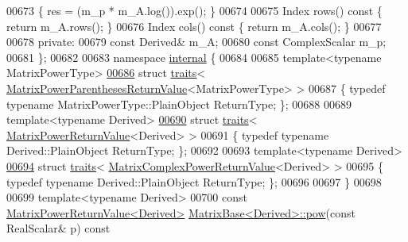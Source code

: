 \begin{DoxyCode}
00673 \textcolor{keyword}{    }\{ res = (m\_p * m\_A.log()).exp(); \}
00674 
00675     Index rows()\textcolor{keyword}{ const }\{ \textcolor{keywordflow}{return} m\_A.rows(); \}
00676     Index cols()\textcolor{keyword}{ const }\{ \textcolor{keywordflow}{return} m\_A.cols(); \}
00677 
00678   \textcolor{keyword}{private}:
00679     \textcolor{keyword}{const} Derived& m\_A;
00680     \textcolor{keyword}{const} ComplexScalar m\_p;
00681 \};
00682 
00683 \textcolor{keyword}{namespace }\hyperlink{namespaceinternal}{internal} \{
00684 
00685 \textcolor{keyword}{template}<\textcolor{keyword}{typename} MatrixPowerType>
\hyperlink{struct_eigen_1_1internal_1_1traits_3_01_matrix_power_parentheses_return_value_3_01_matrix_power_type_01_4_01_4}{00686} \textcolor{keyword}{struct }\hyperlink{struct_eigen_1_1internal_1_1traits}{traits}< \hyperlink{class_eigen_1_1_matrix_power_parentheses_return_value}{MatrixPowerParenthesesReturnValue}<MatrixPowerType> >
00687 \{ \textcolor{keyword}{typedef} \textcolor{keyword}{typename} MatrixPowerType::PlainObject ReturnType; \};
00688 
00689 \textcolor{keyword}{template}<\textcolor{keyword}{typename} Derived>
\hyperlink{struct_eigen_1_1internal_1_1traits_3_01_matrix_power_return_value_3_01_derived_01_4_01_4}{00690} \textcolor{keyword}{struct }\hyperlink{struct_eigen_1_1internal_1_1traits}{traits}< \hyperlink{class_eigen_1_1_matrix_power_return_value}{MatrixPowerReturnValue}<Derived> >
00691 \{ \textcolor{keyword}{typedef} \textcolor{keyword}{typename} Derived::PlainObject ReturnType; \};
00692 
00693 \textcolor{keyword}{template}<\textcolor{keyword}{typename} Derived>
\hyperlink{struct_eigen_1_1internal_1_1traits_3_01_matrix_complex_power_return_value_3_01_derived_01_4_01_4}{00694} \textcolor{keyword}{struct }\hyperlink{struct_eigen_1_1internal_1_1traits}{traits}< \hyperlink{class_eigen_1_1_matrix_complex_power_return_value}{MatrixComplexPowerReturnValue}<Derived> >
00695 \{ \textcolor{keyword}{typedef} \textcolor{keyword}{typename} Derived::PlainObject ReturnType; \};
00696 
00697 \}
00698 
00699 \textcolor{keyword}{template}<\textcolor{keyword}{typename} Derived>
00700 \textcolor{keyword}{const} \hyperlink{class_eigen_1_1_matrix_power_return_value}{MatrixPowerReturnValue<Derived>} 
      \hyperlink{group___core___module_class_eigen_1_1_matrix_base}{MatrixBase<Derived>::pow}(\textcolor{keyword}{const} RealScalar& p)\textcolor{keyword}{ const}

\end{DoxyCode}
